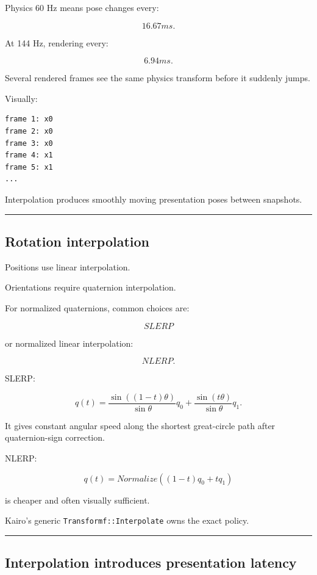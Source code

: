 Physics 60 Hz means pose changes every:

\[
16.67ms.
\]

At 144 Hz, rendering every:

\[
6.94ms.
\]

Several rendered frames see the same physics transform before it suddenly jumps.

Visually:

\begin{verbatim}
frame 1: x0
frame 2: x0
frame 3: x0
frame 4: x1
frame 5: x1
...
\end{verbatim}

Interpolation produces smoothly moving presentation poses between snapshots.

\begin{center}\rule{0.5\linewidth}{0.5pt}\end{center}

\subsection{Rotation interpolation}\label{06-engine-ii-ch037-rotation-interpolation}

Positions use linear interpolation.

Orientations require quaternion interpolation.

For normalized quaternions, common choices are:

\[
SLERP
\]

or normalized linear interpolation:

\[
NLERP.
\]

SLERP:

\[
q(t)
=
\frac{
\sin((1-t)\theta)
}{
\sin\theta
}q_0
+
\frac{
\sin(t\theta)
}{
\sin\theta
}q_1.
\]

It gives constant angular speed along the shortest great-circle path after quaternion-sign correction.

NLERP:

\[
q(t)
=
Normalize(
(1-t)q_0+tq_1
)
\]

is cheaper and often visually sufficient.

Kairo's generic \texttt{Transformf::Interpolate} owns the exact policy.

\begin{center}\rule{0.5\linewidth}{0.5pt}\end{center}

\subsection{Interpolation introduces presentation latency}\label{06-engine-ii-ch037-interpolation-introduces-presentation-latency}

